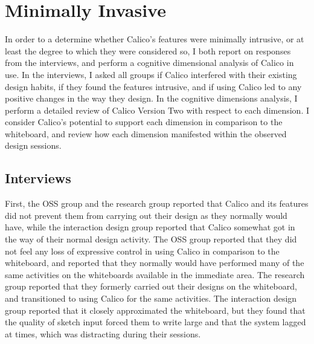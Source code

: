 \section{Minimally Invasive}
\label{chapter:discussion:minimally-invasive}

In order to a determine whether Calico's features were minimally intrusive, or at least the degree to which they were considered so, I both report on responses from the interviews, and perform a cognitive dimensional analysis of Calico in use. In the interviews, I asked all groups if Calico interfered with their existing design habits, if they found the features intrusive, and if using Calico led to any positive changes in the way they design. In the cognitive dimensions analysis, I perform a detailed review of Calico Version Two with respect to each dimension. I consider Calico's potential to support each dimension in comparison to the whiteboard, and review how each dimension manifested within the observed design sessions.

\subsection{Interviews}

First, the OSS group and the research group reported that Calico and its features did not prevent them from carrying out their design as they normally would have, while the interaction design group reported that Calico somewhat got in the way of their normal design activity. The OSS group reported that they did not feel any loss of expressive control in using Calico in comparison to the whiteboard, and reported that they normally would have performed many of the same activities on the whiteboards available in the immediate area. The research group reported that they formerly carried out their designs on the whiteboard, and transitioned to using Calico for the same activities. The interaction design group reported that it closely approximated the whiteboard, but they found that the quality of sketch input forced them to write large and that the system lagged at times, which was distracting during their sessions.


